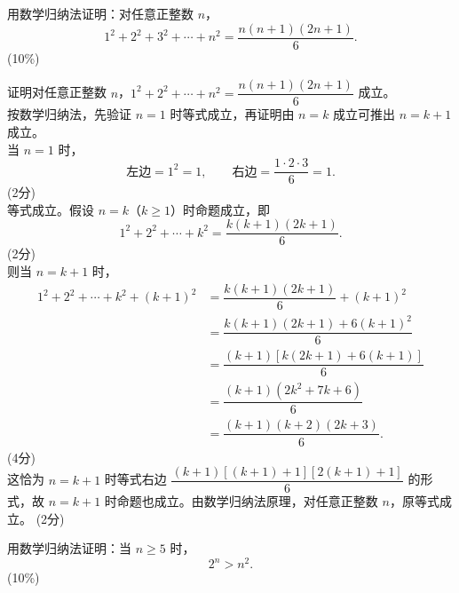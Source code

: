 \documentclass[12pt,a4paper]{exam-zh}
\begin{document}
\begin{question}[points = 10]
    用数学归纳法证明：对任意正整数 $n$，
    \[
    1^2+2^2+3^2+\cdots+n^2=\dfrac{n(n+1)(2n+1)}{6}.
    \]
    \hfill (10\%)
\end{question}

\begin{solution}
    证明对任意正整数 $n$，$1^2+2^2+\cdots+n^2=\dfrac{n(n+1)(2n+1)}{6}$ 成立。\\
    按数学归纳法，先验证 $n=1$ 时等式成立，再证明由 $n=k$ 成立可推出 $n=k+1$ 成立。\\
    当 $n=1$ 时，
    \[
    \text{左边}=1^2=1,\qquad \text{右边}=\dfrac{1\cdot 2\cdot 3}{6}=1.
    \]
    \hfill (2分) \\
    等式成立。假设 $n=k$（$k\geqslant 1$）时命题成立，即
    \[
    1^2+2^2+\cdots+k^2=\dfrac{k(k+1)(2k+1)}{6}.
    \]
    \hfill (2分) \\
    则当 $n=k+1$ 时，
    \begin{align*}
        1^2+2^2+\cdots+k^2+(k+1)^2 &= \dfrac{k(k+1)(2k+1)}{6}+(k+1)^2 \\
        &= \dfrac{k(k+1)(2k+1)+6(k+1)^2}{6} \\
        &= \dfrac{(k+1)\left[k(2k+1)+6(k+1)\right]}{6} \\
        &= \dfrac{(k+1)(2k^2+7k+6)}{6} \\
        &= \dfrac{(k+1)(k+2)(2k+3)}{6}.
    \end{align*}
    \hfill (4分) \\
    这恰为 $n=k+1$ 时等式右边 $\dfrac{(k+1)\left[(k+1)+1\right]\left[2(k+1)+1\right]}{6}$ 的形式，故 $n=k+1$ 时命题也成立。由数学归纳法原理，对任意正整数 $n$，原等式成立。
    \hfill (2分)
\end{solution}

\begin{question}[points = 10]
    用数学归纳法证明：当 $n\geqslant 5$ 时，
    \[
    2^n>n^2.
    \]
    \hfill (10\%)
\end{question}
\end{document}
